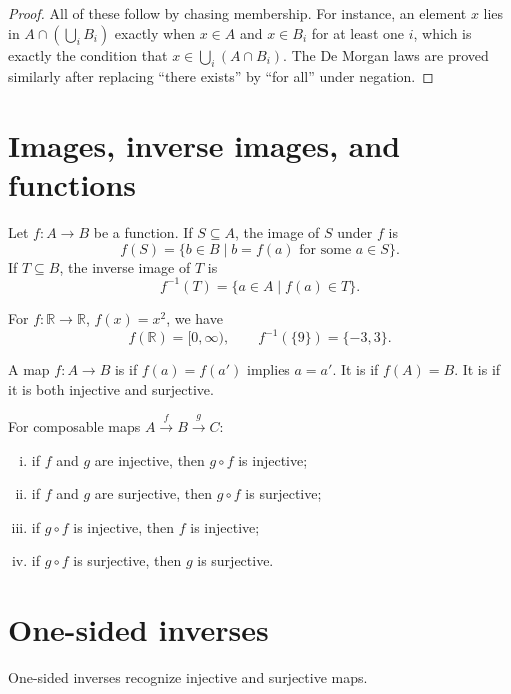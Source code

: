 \begin{proof}
All of these follow by chasing membership.  For instance, an element \(x\) lies in \(A\cap(\bigcup_i B_i)\) exactly when \(x\in A\) and \(x\in B_i\) for at least one \(i\), which is exactly the condition that \(x\in \bigcup_i(A\cap B_i)\).  The De Morgan laws are proved similarly after replacing ``there exists'' by ``for all'' under negation.
\end{proof}

\section{Images, inverse images, and functions}

Let \(f:A\to B\) be a function.  If \(S\subseteq A\), the image of \(S\) under \(f\) is
\[
  f(S)=\{b\in B\mid b=f(a)\text{ for some }a\in S\}.
\]
If \(T\subseteq B\), the inverse image of \(T\) is
\[
  f^{-1}(T)=\{a\in A\mid f(a)\in T\}.
\]

\begin{example}
For \(f:\mathbb R\to\mathbb R\), \(f(x)=x^2\), we have
\[
  f(\mathbb R)=[0,\infty),
  \qquad
  f^{-1}(\{9\})=\{-3,3\}.
\]
\end{example}

A map \(f:A\to B\) is  if \(f(a)=f(a')\) implies \(a=a'\).  It is  if \(f(A)=B\).  It is  if it is both injective and surjective.

\begin{proposition}
For composable maps \(A\xrightarrow{f}B\xrightarrow{g}C\):
\begin{enumerate}[(i)]
  \item if \(f\) and \(g\) are injective, then \(g\circ f\) is injective;
  \item if \(f\) and \(g\) are surjective, then \(g\circ f\) is surjective;
  \item if \(g\circ f\) is injective, then \(f\) is injective;
  \item if \(g\circ f\) is surjective, then \(g\) is surjective.
\end{enumerate}
\end{proposition}

\section{One-sided inverses}

One-sided inverses recognize injective and surjective maps.

